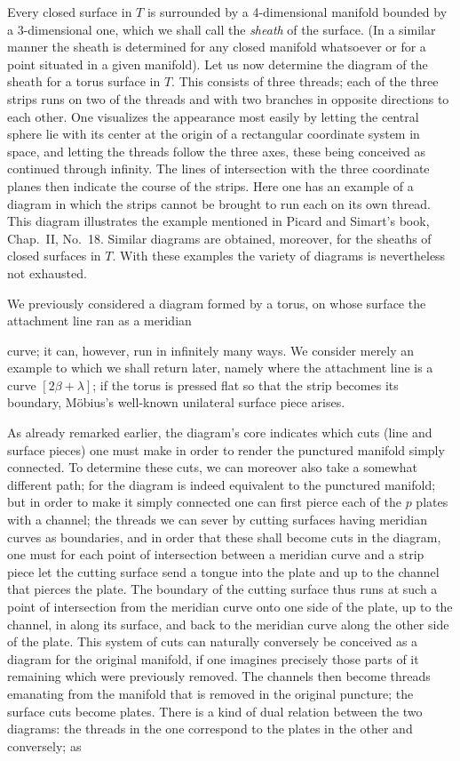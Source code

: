 \documentclass{article}
\begin{document}
Every closed surface in $T$ is surrounded by a 4-dimensional manifold bounded by a 3-dimensional one, which we shall call the \emph{sheath} of the surface. (In a similar manner the sheath is determined for any closed manifold whatsoever or for a point situated in a given manifold). Let us now determine the diagram of the sheath for a torus surface in $T$. This consists of three threads; each of the three strips runs on two of the threads and with two branches in opposite directions to each other. One visualizes the appearance most easily by letting the central sphere lie with its center at the origin of a rectangular coordinate system in space, and letting the threads follow the three axes, these being conceived as continued through infinity. The lines of intersection with the three coordinate planes then indicate the course of the strips. Here one has an example of a diagram in which the strips cannot be brought to run each on its own thread. This diagram illustrates the example mentioned in Picard and Simart's book, Chap.\ II, No.\ 18. Similar diagrams are obtained, moreover, for the sheaths of closed surfaces in $T$. With these examples the variety of diagrams is nevertheless not exhausted.

We previously considered a diagram formed by a torus, on whose surface the attachment line ran as a meridian

curve; it can, however, run in infinitely many ways. We consider merely an example to which we shall return later, namely where the attachment line is a curve $[2\beta + \lambda]$; if the torus is pressed flat so that the strip becomes its boundary, Möbius's well-known unilateral surface piece arises.

As already remarked earlier, the diagram's core indicates which cuts (line and surface pieces) one must make in order to render the punctured manifold simply connected. To determine these cuts, we can moreover also take a somewhat different path; for the diagram is indeed equivalent to the punctured manifold; but in order to make it simply connected one can first pierce each of the $p$ plates with a channel; the threads we can sever by cutting surfaces having meridian curves as boundaries, and in order that these shall become cuts in the diagram, one must for each point of intersection between a meridian curve and a strip piece let the cutting surface send a tongue into the plate and up to the channel that pierces the plate. The boundary of the cutting surface thus runs at such a point of intersection from the meridian curve onto one side of the plate, up to the channel, in along its surface, and back to the meridian curve along the other side of the plate. This system of cuts can naturally conversely be conceived as a diagram for the original manifold, if one imagines precisely those parts of it remaining which were previously removed. The channels then become threads emanating from the manifold that is removed in the original puncture; the surface cuts become plates. There is a kind of dual relation between the two diagrams: the threads in the one correspond to the plates in the other and conversely; as
\end{document}
